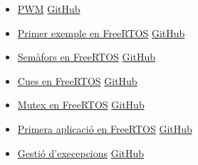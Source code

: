 \begin{itemize}
 \item \hyperref[sub:PWM_example]{PWM} \href{https://github.com/mariusmm/cursembedded/tree/master/Simplicity/PWM_1}{GitHub}
 \item \hyperref[sec:FreeRTOS_exemple_1]{Primer exemple en FreeRTOS} \href{https://github.com/mariusmm/cursembedded/tree/master/Simplicity/FreeRTOS_Blink}{GitHub}
 \item \hyperref[sub:semafors_exemple]{Semàfors en FreeRTOS} \href{https://github.com/mariusmm/cursembedded/tree/master/Simplicity/FreeRTOS_Semaphore}{GitHub}
 \item \hyperref[sub:cues_exemple]{Cues en FreeRTOS} \href{https://github.com/mariusmm/cursembedded/tree/master/Simplicity/FreeRTOS_Queue}{GitHub}
 \item \hyperref[sub:mutex_exemple]{Mutex en FreeRTOS} \href{https://github.com/mariusmm/cursembedded/tree/master/Simplicity/FreeRTOS_Mutex}{GitHub}
 \item \hyperref[ch:aplicacióFreeRTOS]{Primera aplicació en FreeRTOS} \href{https://github.com/mariusmm/cursembedded/tree/master/Simplicity/FreeRTOS_App_1}{GitHub}
 \item \hyperref[ch:exceptions]{Gestió d'execepcions} \href{https://github.com/mariusmm/cursembedded/tree/master/Simplicity/ErrorHandling}{GitHub}
\end{itemize}
